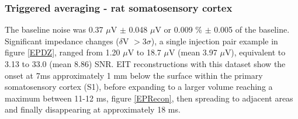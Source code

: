 \subsubsection{Triggered averaging - rat somatosensory cortex}

The baseline noise was 0.37 $\mu$V $\pm$ 0.048 $\mu$V or 0.009 \% $\pm$ 0.005 of the baseline. Significant impedance changes ($\delta$V $> 3\sigma$), a single injection pair example in figure \ref{EPDZ}, ranged from 1.20 $\mu$V to 18.7 $\mu$V (mean 3.97 $\mu$V), equivalent to 3.13 to 33.0 (mean 8.86) SNR. EIT reconstructions with this dataset show the onset at 7ms approximately 1 mm below the surface within the primary somatosensory cortex (S1), before expanding to a larger volume reaching a maximum between 11-12 ms, figure \ref{EPRecon}, then spreading to adjacent areas and finally disappearing at approximately 18 ms. 
